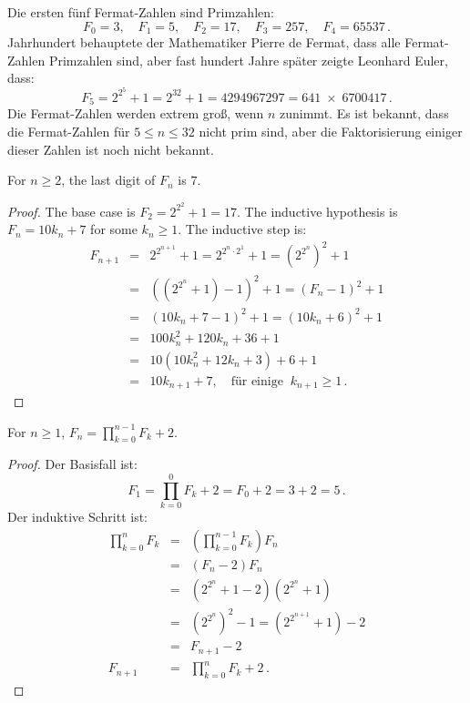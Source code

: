 Die ersten fünf Fermat-Zahlen sind Primzahlen:
\[
F_0=3,\quad F_1=5,\quad F_2=17,\quad F_3=257,\quad F_4=65537\,.
\]
Jahrhundert behauptete der Mathematiker Pierre de Fermat, dass alle Fermat-Zahlen Primzahlen sind, aber fast hundert Jahre später zeigte Leonhard Euler, dass:
\[F_5=2^{2^5}+1 = 2^{32}+1 = 4294967297 = 641 \;\times\; 6700417\,.\]
Die Fermat-Zahlen werden extrem groß, wenn $n$ zunimmt. Es ist bekannt, dass die Fermat-Zahlen für $5\leq n \leq 32$ nicht prim sind, aber die Faktorisierung einiger dieser Zahlen ist noch nicht bekannt.

\begin{theorem}
For $n\geq 2$, the last digit of $F_n$ is $7$.
\end{theorem}
\begin{proof}
The base case is $F_2=2^{2^2}+1=17$.
The inductive hypothesis is $F_n=10k_n+7$ for some $k_n\geq 1$. The inductive step is:
\begin{eqnarray*}
F_{n+1}&=&2^{2^{n+1}}+1=2^{2^{n}\cdot 2^1}+1=\left(2^{2^{n}}\right)^2+1\\
&=&\left(\left(2^{2^{n}}+1\right)-1\right)^2+1=(F_n-1)^2+1\\
&=&(10k_n+7-1)^2+1=(10k_n+6)^2+1\\
&=&100k_n^2+120k_n+36+1\\
&=&10(10k_n^2+12k_n+3)+6+1\\
&=&10k_{n+1}+7,\quad \textrm{für einige} \;\;k_{n+1}\geq 1\,.
\end{eqnarray*}
\end{proof}


\begin{theorem}
For $n\geq 1$, $\displaystyle F_n = \prod_{k=0}^{n-1} F_k + 2$.
\end{theorem}
\begin{proof}
Der Basisfall ist:
\[
F_1=\prod_{k=0}^{0} F_k + 2=F_0+2=3+2=5\,.
\]
Der induktive Schritt ist:
\begin{eqnarray*}
\prod_{k=0}^{n}F_k&=&\left(\prod_{k=0}^{n-1}F_k\right) F_n \\
&=& (F_n-2)F_n\\
&=& \left(2^{2^n}+1-2\right)\left(2^{2^n}+1\right)\\
&=& \left(2^{2^{n}}\right)^2-1= \left(2^{2^{n+1}}+1\right)-2\\
&=&F_{n+1}-2\\
F_{n+1}&=&\prod_{k=0}^{n}F_k + 2\,.
\end{eqnarray*}
\end{proof}


